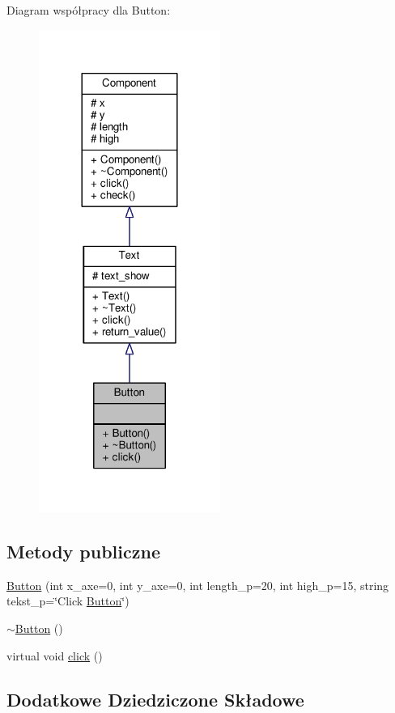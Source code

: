 Diagram współpracy dla Button\+:\nopagebreak
\begin{figure}[H]
\begin{center}
\leavevmode
\includegraphics[width=168pt]{classButton__coll__graph}
\end{center}
\end{figure}
\subsection*{Metody publiczne}
\begin{DoxyCompactItemize}
\item 
\hyperlink{classButton_affc1899d8e846ffda38377637d675d29}{Button} (int x\+\_\+axe=0, int y\+\_\+axe=0, int length\+\_\+p=20, int high\+\_\+p=15, string tekst\+\_\+p=\char`\"{}Click \hyperlink{classButton}{Button}\char`\"{})
\item 
\hyperlink{classButton_a2a001eb9c3cc8ae54768a850dd345002}{$\sim$\+Button} ()
\item 
virtual void \hyperlink{classButton_a2fc33ec22217562b28ac6f02bda26c6e}{click} ()
\end{DoxyCompactItemize}
\subsection*{Dodatkowe Dziedziczone Składowe}


